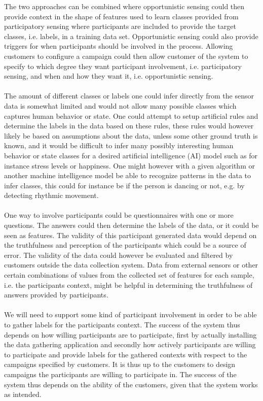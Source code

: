 The two approaches can be combined where opportunistic sensing could then provide context in the shape of features used to learn classes provided from participatory sensing where participants are included to provide the target classes, i.e. labels, in a training data set. Opportunistic sensing could also provide triggers for when participants should be involved in the process. Allowing customers to configure a campaign could then allow customer of the system to specify to which degree they want participant involvement, i.e. participatory sensing, and when and how they want it, i.e. opportunistic sensing.
\\\\
The amount of different classes or labels one could infer directly from the sensor data is somewhat limited and would not allow many possible classes which captures human behavior or state. One could attempt to setup artificial rules and determine the labels in the data based on these rules, these rules would however likely be based on assumptions about the data, unless some other ground truth is known, and it would be difficult to infer many possibly interesting human behavior or state classes for a desired artificial intelligence (AI) model such as for instance stress levels or happiness. One might however with a given algorithm or another machine intelligence model be able to recognize patterns in the data to infer classes, this could for instance be if the person is dancing or not, e.g. by detecting rhythmic movement.    
\\\\
One way to involve participants could be questionnaires with one or more questions. The answers could then determine the labels of the data, or it could be seen as features. The validity of this participant generated data would depend on the truthfulness and perception of the participants which could be a source of error. The validity of the data could however be evaluated and filtered by customers outside the data collection system. Data from external sensors or other certain combinations of values from the collected set of features for each sample, i.e. the participants context, might be helpful in determining the truthfulness of answers provided by participants.
\\\\
We will need to support some kind of participant involvement in order to be able to gather labels for the participants context. The success of the system thus depends on how willing participants are to participate, first by actually installing the data gathering application and secondly how actively participants are willing to participate and provide labels for the gathered contexts with respect to the campaigns specified by customers. It is thus up to the customers to design campaigns the participants are willing to participate in. The success of the system thus depends on the ability of the customers, given that the system works as intended.
